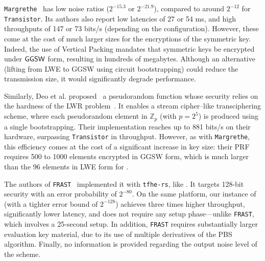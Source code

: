 \texttt{Margrethe}~\cite{EPRINT:AGHM24} has low noise ratios ($2^{-15.3}$ or $2^{-21.9}$), compared to around $2^{-12}$ for \texttt{Transistor}. Its authors also report low latencies of 27 or 54 ms, and high throughputs of 147 or 73 bits/s (depending on the configuration). However, these come at the cost of much larger sizes for the encryptions of the symmetric key. Indeed, the use of Vertical Packing mandates that symmetric keys be encrypted under $\textsf{GGSW}$ form, resulting in hundreds of megabytes. Although an alternative (lifting from LWE to GGSW using circuit bootstrapping) could reduce the transmission size, it would significantly degrade performance. 

Similarly, Deo et al. proposed~\cite{EPRINT:DJLCB24} a pseudorandom function whose security relies on the hardness of the LWR problem~\cite{EC:BanPeiRos12}. It enables a stream cipher–like transciphering scheme, where each pseudorandom element in $\mathbb{Z}_p$ (with $p=2^5$) is produced using a single bootstrapping. Their implementation reaches up to 881 bits/s on their hardware, surpassing \texttt{Transistor} in throughput. However, as with \texttt{Margrethe}, this efficiency comes at the cost of a significant increase in key size: their PRF requires 500 to 1000 elements encrypted in GGSW form, which is much larger than the 96 elements in LWE form for \coolName.


The authors of \texttt{FRAST}~\cite{ToSC:CCHLOS24} implemented it with \texttt{tfhe-rs}, like \coolName. It targets 128-bit security with an error probability of $2^{-80}$. On the same platform, our instance of \coolName (with a tighter error bound of $2^{-128}$) achieves three times higher throughput, significantly lower latency, and does not require any setup phase—unlike \texttt{FRAST}, which involves a 25-second setup. In addition, \texttt{FRAST} requires substantially larger evaluation key material, due to its use of multiple derivatives of the PBS algorithm. Finally, no information is provided regarding the output noise level of the scheme.



